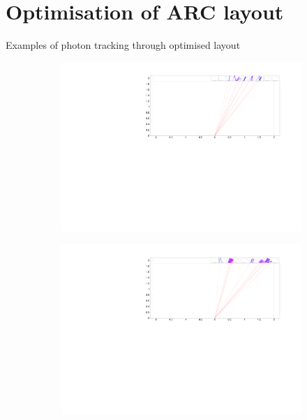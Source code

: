 \documentclass{beamer}
\begin{document}
\section{Optimisation of ARC layout}
\begin{frame}{Examples of photon tracking through optimised layout}
  \begin{figure}
    \centering
    \begin{subfigure}{0.45\textwidth}
      \includegraphics[width = 1.0\textwidth, trim = {11cm 5cm 3.5cm 0}, clip = true]{Plots/EventDisplay_MainRow.pdf}
    \end{subfigure}%
    \hspace{0.2cm}
    \begin{subfigure}{0.45\textwidth}
      \includegraphics[width = 1.0\textwidth, trim = {11.6cm 5cm 2.9cm 0}, clip = true]{Plots/EventDisplay_MainRow_Aerogel.pdf}

\end{subfigure}
\end{figure}
\end{frame}
\end{document}

